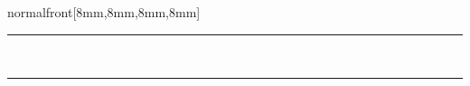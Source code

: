 \documentclass[
    coverwidth=160mm,
    coverheight=227mm,
    spinewidth=9mm,
    markcolor=black,
    marklength=8mm,
    trimmed=true,
    ]
    {bookcover}
\begin{document}
\begin{bookcover}
\begin{bookcoverelement}{normal}{front}[8mm,8mm,8mm,8mm]
            \par\noindent\rule{72mm}{0.4pt}\\
            {\bdivolume{\autorVier}}
            \begin{center}
                \bdicover \artikelVier 
            \end{center}
            \bigskip

            \hspace{72mm}\noindent\rule{72mm}{0.4pt}\\\bigskip
            \hfill{\bdivolume{\autorFuenf}}
            \begin{center}
                \bdicover \artikelFuenf
            \end{center}
            
        \end{bookcoverelement}


\end{bookcover}
\end{document}
